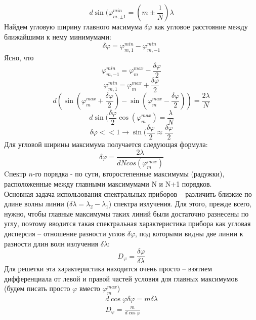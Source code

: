\documentclass[__main__.tex]{subfiles}
\begin{document}
$$d\sin(\varphi^{min}_{m, \pm1} = (m \pm \frac{1}{N})\lambda$$
Найдем угловую ширину главного масимума $\delta\varphi$ как угловое расстояние между ближайшими к нему минимумами:
$$\delta\varphi = \varphi^{min}_{m, 1} - \varphi^{min}_{m, -1} $$
Ясно, что 
$$\varphi^{min}_{m, -1} = \varphi^{max}_{m} - \frac{\delta \varphi}{2}$$
$$\varphi^{min}_{m, 1} = \varphi^{max}_{m} + \frac{\delta\varphi}{2}$$
$$d(\sin(\varphi^{max}_{m} + \frac{\delta\varphi}{2}) - \sin(\varphi^{max}_{m} - \frac{\delta\varphi}{2})) = \frac{2\lambda}{N} $$
$$d\sin(\frac{\delta \varphi}{2} \cos(\varphi^{max}_m) = \frac{\lambda}{N}$$
$$\delta\varphi << 1 \rightarrow \sin(\frac{\delta\varphi}{2} \approx \frac{\delta\varphi}{2}$$
Для угловой ширины максимума получается следующая формула:
$$\delta\varphi = \frac{2\lambda}{dNcos(\varphi^{max}_m)}$$
Cпектр $n$-го порядка - по сути, второстепенные максимумы (радужки), расположенные между главными максимумами N и N+1 порядков.\\
Основная задача использования спектральных приборов – различить близкие по длине волны линии ($\delta \lambda = \lambda_2 - \lambda_1$) спектра излучения. Для этого, прежде всего, нужно, чтобы главные максимумы таких линий были достаточно разнесены по углу, поэтому вводится такая спектральная характеристика прибора как угловая дисперсия – отношение разности углов $\delta\varphi$, под которыми видны две линии к разности длин волн излучения $\delta\lambda$:
$$D_\varphi = \frac{\delta\varphi}{\delta\lambda}$$
Для решетки эта характеристика находится очень просто – взятием дифференциала от левой и правой частей условия для главных максимумов (будем писать просто $\varphi$ вместо $\varphi^{max}_m$)
\begin{gather*}
d\cos\varphi \delta\varphi = m\delta\lambda\\
D_\varphi = \frac{m}{d\cos \varphi}
\end{gather*}
\end{document}
